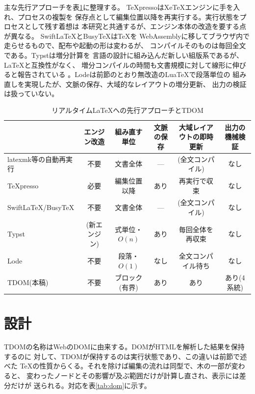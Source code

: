 \documentclass[a4paper,11pt]{ltjsarticle}
\newcommand{\tdom}{TDOM}
\begin{document}
主な先行アプローチを表\ref{tab:prior}に整理する。
TeXpresso\cite{bour2023}はXeTeXエンジンに手を入れ、プロセスの複製を
保存点として編集位置以降を再実行する。実行状態をプロセスとして残す着想は
本研究と共通するが、エンジン本体の改造を要する点が異なる。
SwiftLaTeX\cite{swiftlatex}とBusyTeX\cite{busytex}は\TeX{}を
WebAssemblyに移してブラウザ内で走らせるもので、配布や起動の形は変わるが、
コンパイルそのものは毎回全文である。Typst\cite{haug2022,typst}は増分計算を
言語の設計に組み込んだ新しい組版系であるが、\LaTeX{}と互換性がなく、
増分コンパイルの時間も文書規模に対して線形に伸びると報告されている
\cite{lode2026}。Lode\cite{lode2026}は前節のとおり無改造のLuaTeXで段落単位の
組み直しを実現したが、文脈の保存、大域的なレイアウトの増分更新、
出力の検証は扱っていない。

\begin{table}[tb]
  \centering\footnotesize
  \setlength{\tabcolsep}{4pt}
  \caption{リアルタイム\LaTeX{}への先行アプローチと\tdom{}}
  \label{tab:prior}
  \begin{tabular}{@{}lccccc@{}}
    \toprule
    & エンジン改造 & 組み直す単位 & 文脈の保存 & 大域レイアウトの即時更新 & 出力の機械検証\\
    \midrule
    latexmk等の自動再実行 & 不要 & 文書全体 & --- & (全文コンパイル) & なし\\
    TeXpresso\cite{bour2023} & 必要 & 編集位置以降 & あり & 再実行で収束 & なし\\
    SwiftLaTeX/BusyTeX & 不要 & 文書全体 & --- & (全文コンパイル) & なし\\
    Typst\cite{haug2022} & (新エンジン) & 式単位・$O(n)$ & あり & 毎回全体を再収束 & なし\\
    Lode\cite{lode2026} & 不要 & 段落・$O(1)$ & なし & 全文コンパイル待ち & なし\\
    \tdom{}(本稿) & 不要 & ブロック(有界) & あり & あり & あり(4系統)\\
    \bottomrule
  \end{tabular}
\end{table}

\section{設計}\label{sec:concept}

\tdom{}の名称はWebのDOMに由来する。DOMがHTMLを解析した結果を保持するのに
対して、\tdom{}が保持するのは実行状態であり、この違いは前節で述べた
\TeX{}の性質からくる。それを除けば編集の流れは同型で、木の一部が変わると、
変わったノードとその影響が及ぶ範囲だけが計算し直され、表示には差分だけが
送られる。対応を表\ref{tab:dom}に示す。
\end{document}
